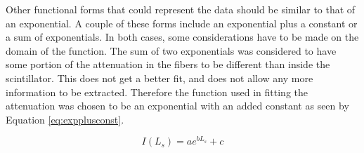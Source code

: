 
\begin{comment}
\begin{equation}
    I(L_{s})= ae^{(b_{1} + b_{2})L_{s} + b_{1}L_{f}}
    \label{eq:try1mid}
\end{equation}

\FloatBarrier
\begin{figure}[h]
    \centering
    \texttt{[image: exponential67eq9]}
    \caption{Plotted is the fit of equation \ref{eq:try1mid} as a function of $L_{s}$.}
    \label{fig:try1mid}
\end{figure}
\end{comment}
\FloatBarrier


Other functional forms that could represent the data should be similar to that of an exponential.
A couple of these forms include an exponential plus a constant or a sum of exponentials.
In both cases, some considerations have to be made on the domain of the function.
The sum of two exponentials was considered to have some portion of the attenuation in the fibers to 
be different than inside the scintillator. This does not get a better fit, and does not allow any more 
information to be extracted. Therefore the function used in fitting the attenuation was chosen to be 
an exponential with an added constant as seen by Equation \ref{eq:expplusconst}.

\begin{equation}
    I(L_{s}) = ae^{bL_{s}}+c
    \label{eq:expplusconst}
\end{equation}


\FloatBarrier
